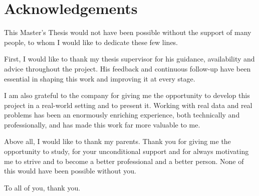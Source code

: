 \chapter*{Acknowledgements}

This Master's Thesis would not have been possible without the support of many people, to whom I would like to dedicate these few lines.

First, I would like to thank my thesis supervisor for his guidance, availability and advice throughout the project. His feedback and continuous follow-up have been essential in shaping this work and improving it at every stage.

I am also grateful to the company for giving me the opportunity to develop this project in a real-world setting and to present it. Working with real data and real problems has been an enormously enriching experience, both technically and professionally, and has made this work far more valuable to me.

Above all, I would like to thank my parents. Thank you for giving me the opportunity to study, for your unconditional support and for always motivating me to strive and to become a better professional and a better person. None of this would have been possible without you.

To all of you, thank you.
